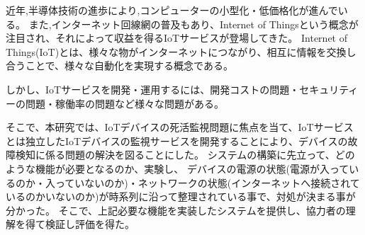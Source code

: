 近年,半導体技術の進歩により,コンピューターの小型化・低価格化が進んでいる。
また,インターネット回線網の普及もあり、Internet of Thingsという概念が注目され、それによって収益を得るIoTサービスが登場してきた。
Internet of Things(IoT)とは、様々な物がインターネットにつながり、相互に情報を交換し合うことで、様々な自動化を実現する概念である。

しかし、IoTサービスを開発・運用するには、開発コストの問題・セキュリティーの問題・稼働率の問題など様々な問題がある。

そこで、本研究では、IoTデバイスの死活監視問題に焦点を当て、IoTサービスとは独立したIoTデバイスの監視サービスを開発することにより、デバイスの故障検知に係る問題の解決を図ることにした。
システムの構築に先立って、どのような機能が必要となるのか、実験し、
デバイスの電源の状態(電源が入っているのか・入っていないのか)・ネットワークの状態(インターネットへ接続されているのかいないのか)が時系列に沿って整理されている事で、対処が決まる事が分かった。
そこで、上記必要な機能を実装したシステムを提供し、協力者の理解を得て検証し評価を得た。




